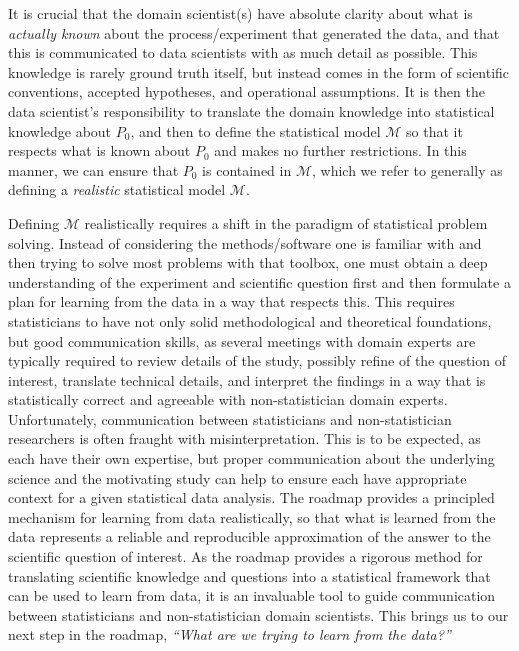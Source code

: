 \documentclass[
  12pt, krantz2,
]{krantz}
\newcommand{\M}{\mathcal{M}}
\newcommand{\1}{\mathbbm{1}}
\theoremstyle{definition}
\theoremstyle{definition}
\theoremstyle{definition}
\theoremstyle{definition}
\theoremstyle{remark}
\begin{document}
It is crucial that the domain scientist(s) have absolute clarity about what is
\emph{actually known} about the process/experiment that generated the data, and that
this is communicated to data scientists with as much detail as possible. This
knowledge is rarely ground truth itself, but instead comes in the form of
scientific conventions, accepted hypotheses, and operational assumptions.
It is then the data scientist's responsibility to translate the domain knowledge
into statistical knowledge about \(P_0\), and then to define the statistical model
\(\M\) so that it respects what is known about \(P_0\) and makes no further
restrictions. In this manner, we can ensure that \(P_0\) is contained in \(\M\),
which we refer to generally as defining a \emph{realistic} statistical model \(\M\).

Defining \(\M\) realistically requires a shift in the paradigm of statistical
problem solving. Instead of considering the methods/software one is familiar
with and then trying to solve most problems with that toolbox, one must obtain a
deep understanding of the experiment and scientific question first and then
formulate a plan for learning from the data in a way that respects this. This
requires statisticians to have not only solid methodological and theoretical
foundations, but good communication skills, as several meetings with domain
experts are typically required to review details of the study, possibly refine
of the question of interest, translate technical details, and interpret the
findings in a way that is statistically correct and agreeable with
non-statistician domain experts. Unfortunately, communication between
statisticians and non-statistician researchers is often fraught with
misinterpretation. This is to be expected, as each have their own expertise, but
proper communication about the underlying science and the motivating study can
help to ensure each have appropriate context for a given statistical data
analysis. The roadmap provides a principled mechanism for learning from data
realistically, so that what is learned from the data represents a reliable and
reproducible approximation of the answer to the scientific question of interest.
As the roadmap provides a rigorous method for translating scientific knowledge
and questions into a statistical framework that can be used to learn from data,
it is an invaluable tool to guide communication between statisticians and
non-statistician domain scientists. This brings us to our next step in the
roadmap, \emph{``What are we trying to learn from the data?''}
\end{document}
